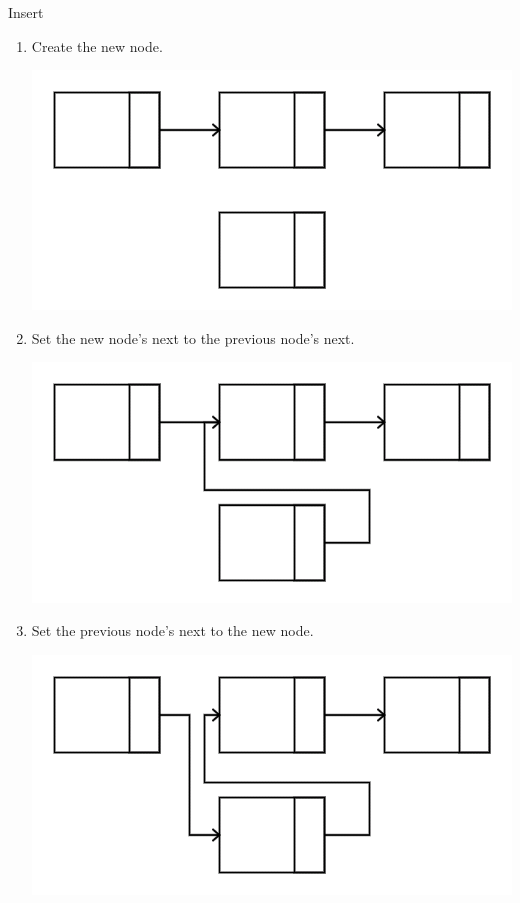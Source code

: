 \documentclass{beamer}
\begin{document}
\begin{frame}{Insert}
   \begin{enumerate}[<+->]
       \item Create the new node.
           \par \includegraphics[height=0.20\textheight]{images/Linking1}
       \item Set the new node's next to the previous node's next.
           \par \includegraphics[height=0.20\textheight]{images/Linking2}
       \item Set the previous node's next to the new node.
           \par \includegraphics[height=0.20\textheight]{images/Linking3}
   \end{enumerate}
\end{frame}
\end{document}
